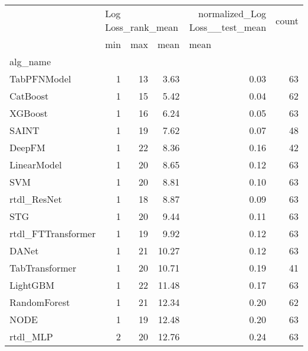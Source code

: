 \begin{tabular}{lrrrrr}
\toprule
{} & \multicolumn{3}{l}{Log Loss_rank_mean} & normalized_Log Loss__test_mean & count \\
{} &                min & max &   mean & \multicolumn{2}{l}{mean} \\
alg_name           &                    &     &        &                                &       \\
\midrule
TabPFNModel        &                  1 &  13 &   3.63 &                           0.03 &    63 \\
CatBoost           &                  1 &  15 &   5.42 &                           0.04 &    62 \\
XGBoost            &                  1 &  16 &   6.24 &                           0.05 &    63 \\
SAINT              &                  1 &  19 &   7.62 &                           0.07 &    48 \\
DeepFM             &                  1 &  22 &   8.36 &                           0.16 &    42 \\
LinearModel        &                  1 &  20 &   8.65 &                           0.12 &    63 \\
SVM                &                  1 &  20 &   8.81 &                           0.10 &    63 \\
rtdl_ResNet        &                  1 &  18 &   8.87 &                           0.09 &    63 \\
STG                &                  1 &  20 &   9.44 &                           0.11 &    63 \\
rtdl_FTTransformer &                  1 &  19 &   9.92 &                           0.12 &    63 \\
DANet              &                  1 &  21 &  10.27 &                           0.12 &    63 \\
TabTransformer     &                  1 &  20 &  10.71 &                           0.19 &    41 \\
LightGBM           &                  1 &  22 &  11.48 &                           0.17 &    63 \\
RandomForest       &                  1 &  21 &  12.34 &                           0.20 &    62 \\
NODE               &                  1 &  19 &  12.48 &                           0.20 &    63 \\
rtdl_MLP           &                  2 &  20 &  12.76 &                           0.24 &    63 \\

\end{tabular}
